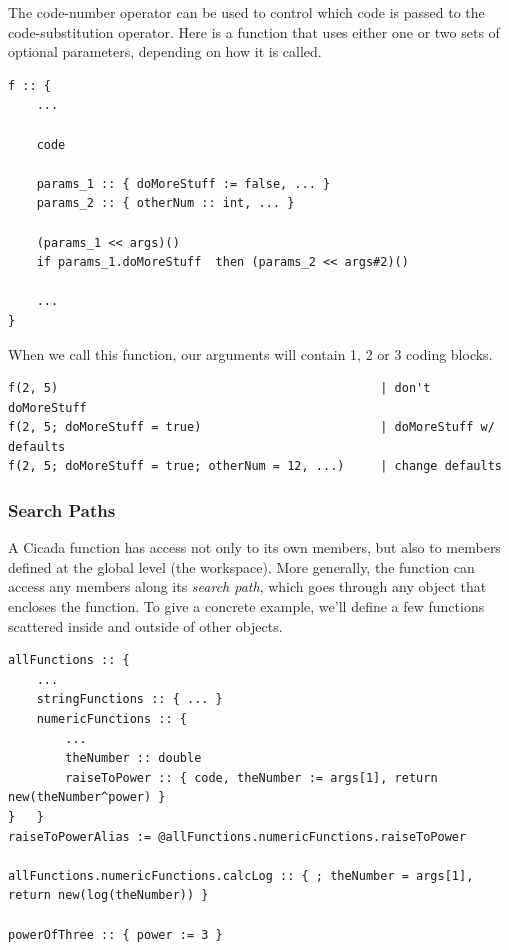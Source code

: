 \documentclass{article}
\newenvironment{code}{
       \begin{list}{}{
               \setlength{\leftmargin}{.4in}
               \setlength{\rightmargin}{0in}
               \setlength{\topsep}{.2in}
       }
       \small
       \item[] }
       { \end{list}   }
\begin{document}
The code-number operator can be used to control which code is passed to the code-substitution operator.  Here is a function that uses either one or two sets of optional parameters, depending on how it is called.

\begin{code} \begin{verbatim}
f :: {
    ...
    
    code
    
    params_1 :: { doMoreStuff := false, ... }
    params_2 :: { otherNum :: int, ... }
    
    (params_1 << args)()
    if params_1.doMoreStuff  then (params_2 << args#2)()
    
    ...
}
\end{verbatim} \end{code}

\noindent When we call this function, our arguments will contain 1, 2 or 3 coding blocks.

\begin{code} \begin{verbatim}
f(2, 5)                                             | don't doMoreStuff
f(2, 5; doMoreStuff = true)                         | doMoreStuff w/ defaults
f(2, 5; doMoreStuff = true; otherNum = 12, ...)     | change defaults
\end{verbatim} \end{code}






\subsubsection{Search Paths} 

A Cicada function has access not only to its own members, but also to members defined at the global level (the workspace).  More generally, the function can access any members along its \emph{search path}, which goes through any object that encloses the function.  To give a concrete example, we'll define a few functions scattered inside and outside of other objects.

\begin{code} \begin{verbatim}
allFunctions :: {
    ...
    stringFunctions :: { ... }
    numericFunctions :: {
        ...
        theNumber :: double
        raiseToPower :: { code, theNumber := args[1], return new(theNumber^power) }
}   }
raiseToPowerAlias := @allFunctions.numericFunctions.raiseToPower

allFunctions.numericFunctions.calcLog :: { ; theNumber = args[1], return new(log(theNumber)) }

powerOfThree :: { power := 3 }
\end{verbatim} \end{code}
\end{document}
